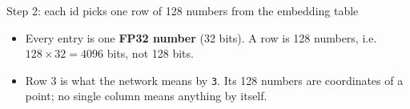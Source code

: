 \documentclass[aspectratio=169,11pt]{beamer}
\begin{document}
\begin{frame}{Step 2: each id picks one row of 128 numbers from the embedding table}
\vspace{1mm}
\begin{itemize}\small
\item Every entry is one \textbf{FP32 number} (32 bits). A row is 128 numbers, i.e.\ $128\times32 = 4096$ bits, not 128 bits.
\item Row 3 is what the network means by \texttt{3}. Its 128 numbers are coordinates of a point; no single column means anything by itself.
\end{itemize}
\end{frame}

\newcommand{\barstrip}[3]{%
  \foreach \v [count=\i from 0] in #2 {\fill[#3] (\i*0.045,#1) rectangle ++(0.035,\v*6);}
  \draw[black!40] (0,#1) -- (128*0.045,#1);}
\end{document}
